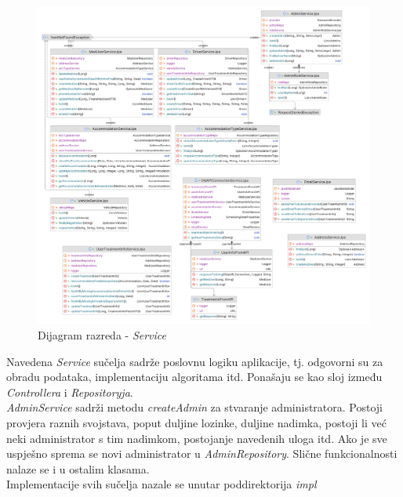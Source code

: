 			\begin{figure}[H]
				\includegraphics[width=\textwidth]{slike/service.PNG}
				\caption{Dijagram razreda - \textit{Service}}
				\label{serviceDiagram}
			\end{figure}
			
			{Navedena \textit{Service} sučelja sadrže poslovnu logiku aplikacije, tj. odgovorni su za obradu podataka, implementaciju algoritama itd. Ponašaju se kao sloj između \textit{Controllera} i \textit{Repositoryja}.\\
			\textit{AdminService} sadrži metodu \textit{createAdmin} za stvaranje administratora. Postoji provjera raznih svojstava, poput duljine lozinke, duljine nadimka, postoji li već neki administrator s tim nadimkom, postojanje navedenih uloga itd. Ako je sve uspješno sprema se novi administrator u \textit{AdminRepository}. Slične funkcionalnosti nalaze se i u ostalim klasama.\\
			Implementacije svih sučelja nazale se unutar poddirektorija \textit{impl}}\\
			
